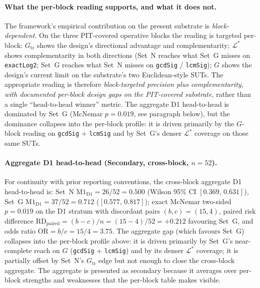 \documentclass[manuscript]{acmart}
\begin{document}
\paragraph{What the per-block reading supports, and what it does not.}
The framework's empirical contribution on the present substrate is
\emph{block-dependent}. On the three PIT-covered operative blocks
the reading is targeted per-block: $G_{\mathrm{tr}}$ shows the
design's directional advantage and complementarity; $\mathcal{L}^{*}$
shows complementarity in both directions (Set~N reaches what Set~G
misses on \texttt{exactLog2}; Set~G reaches what Set~N misses on
\texttt{gcdSig} / \texttt{lcmSig}); $G$ shows the design's current
limit on the substrate's two Euclidean-style SUTs. The appropriate
reading is therefore \emph{block-targeted precision plus
complementarity, with documented per-block design gaps on the
PIT-covered substrate}, rather than a single ``head-to-head winner''
metric. The aggregate D1 head-to-head is dominated by Set~G
(McNemar $p = 0.019$, see paragraph below), but the dominance
collapses into the per-block profile: it is driven primarily by the
$G$-block reading on \texttt{gcdSig} + \texttt{lcmSig} and by Set~G's
denser $\mathcal{L}^{*}$ coverage on those same SUTs.

\paragraph{Aggregate D1 head-to-head (Secondary, cross-block, $n = 52$).}
For continuity with prior reporting conventions, the cross-block
aggregate D1 head-to-head is: Set~N
$\mathrm{M1}_{\mathrm{D1}} = 26/52 = 0.500$ (Wilson 95\% CI
$[0.369,\,0.631]$), Set~G $\mathrm{M1}_{\mathrm{D1}} = 37/52 =
0.712$ ($[0.577,\,0.817]$); exact McNemar two-sided $p = 0.019$
on the D1 stratum with discordant pairs $(b,c) = (15,4)$, paired
risk difference $\mathrm{RD}_{\mathrm{paired}} = (b - c) / n =
(15 - 4) / 52 = +0.212$ favouring Set~G, and odds ratio
$\mathrm{OR} = b / c = 15 / 4 = 3.75$. The
aggregate gap (which favours Set~G) collapses into the per-block
profile above: it is driven primarily by Set~G's near-complete
reach on $G$ (\texttt{gcdSig} + \texttt{lcmSig}) and by its denser
$\mathcal{L}^{*}$ coverage; it is partially offset by Set~N's
$G_{\mathrm{tr}}$ edge but not enough to close the cross-block
aggregate. The aggregate is presented as secondary because it
averages over per-block strengths and weaknesses that the
per-block table makes visible.
\end{document}
